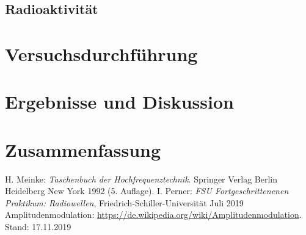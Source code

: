 \documentclass[a4paper,twoside,final]{article}
\begin{document}
\subsection{Radioaktivität}

\section{Versuchsdurchführung} \label{sec:Versuchsdurchführung}

\newpage
\section{Ergebnisse und Diskussion}
\section{Zusammenfassung}

\begin{thebibliography}{xxx}
	H. Meinke: \textit{Taschenbuch der Hochfrequenztechnik}. Springer Verlag Berlin Heidelberg New York 1992 (5. Auflage).
  I. Perner: \textit{FSU Fortgeschrittenenen Praktikum: Radiowellen}, Fried\-rich-Schil\-ler-Uni\-versi\-tät Juli 2019
  Amplitudenmodulation: \url{https://de.wikipedia.org/wiki/Amplitudenmodulation}. Stand: 17.11.2019
\end{thebibliography}
\end{document}
